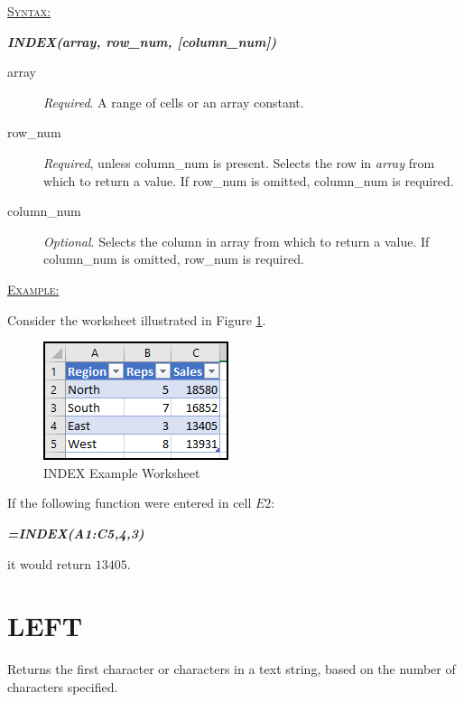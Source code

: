 \begin{addmargin}[1cm]{0cm}
	
	\medskip
	\underline{\textsc{Syntax:}}
	\medskip
	
	{\color{Syntax}
		\noindent\textbf{\textit{INDEX(array, row\_num, [column\_num])}}
	}
	
	\begin{description}
		\item[array] \textit{Required}. A range of cells or an array constant.
		\item[row\_num] \textit{Required}, unless column\_num is present. Selects the row in \textit{array} from which to return a value. If row\_num is omitted, column\_num is required.
		\item[column\_num] \textit{Optional}. Selects the column in array from which to return a value. If column\_num is omitted, row\_num is required. 
	\end{description}

	\medskip
	\noindent\underline{\textsc{Example:}}
	\medskip
	
	\noindent Consider the worksheet illustrated in Figure \ref{apa:idx}.
	
	\begin{figure}[H]
		\centering
		\includegraphics[width=\maxwidth{.45\linewidth}]{gfx/apa_fig01}
		\caption{INDEX Example Worksheet}
		\label{apa:idx}
	\end{figure}
	
	\noindent If the following function were entered in cell $ E2 $:
	
	{\color{Syntax}
		\textit{\textbf{=INDEX(A1:C5,4,3)}}
	}
	
	\noindent it would return $ 13405 $.

\end{addmargin}

\section{LEFT}

Returns the first character or characters in a text string, based on the number of characters specified.

